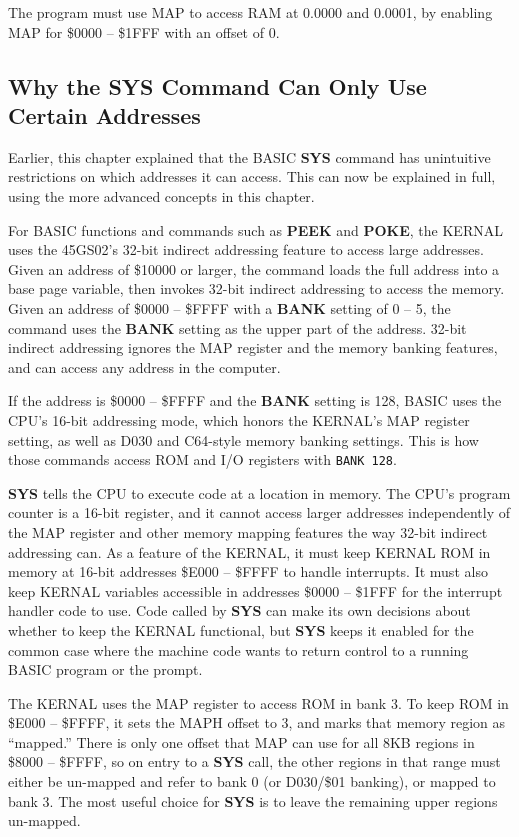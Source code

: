 The program must use MAP to access RAM at 0.0000 and 0.0001, by enabling MAP for \$0000 -- \$1FFF with an offset of 0.

\subsection{Why the SYS Command Can Only Use Certain Addresses}

Earlier, this chapter explained that the BASIC {\bf SYS} command has unintuitive restrictions on which addresses it can access. This can now be explained in full, using the more advanced concepts in this chapter.

For BASIC functions and commands such as {\bf PEEK} and {\bf POKE}, the KERNAL uses the 45GS02's 32-bit indirect addressing feature to access large addresses. Given an address of \$10000 or larger, the command loads the full address into a base page variable, then invokes 32-bit indirect addressing to access the memory. Given an address of \$0000 -- \$FFFF with a {\bf BANK} setting of 0 -- 5, the command uses the {\bf BANK} setting as the upper part of the address. 32-bit indirect addressing ignores the MAP register and the memory banking features, and can access any address in the computer.

If the address is \$0000 -- \$FFFF and the {\bf BANK} setting is 128, BASIC uses the CPU's 16-bit addressing mode, which honors the KERNAL's MAP register setting, as well as D030 and C64-style memory banking settings. This is how those commands access ROM and I/O registers with \texttt{BANK 128}.

{\bf SYS} tells the CPU to execute code at a location in memory. The CPU's program counter is a 16-bit register, and it cannot access larger addresses independently of the MAP register and other memory mapping features the way 32-bit indirect addressing can. As a feature of the KERNAL, it must keep KERNAL ROM in memory at 16-bit addresses \$E000 -- \$FFFF to handle interrupts. It must also keep KERNAL variables accessible in addresses \$0000 -- \$1FFF for the interrupt handler code to use. Code called by {\bf SYS} can make its own decisions about whether to keep the KERNAL functional, but {\bf SYS} keeps it enabled for the common case where the machine code wants to return control to a running BASIC program or the  prompt.

The KERNAL uses the MAP register to access ROM in bank 3. To keep ROM in \$E000 -- \$FFFF, it sets the MAPH offset to 3, and marks that memory region as ``mapped.'' There is only one offset that MAP can use for all 8KB regions in \$8000 -- \$FFFF, so on entry to a {\bf SYS} call, the other regions in that range must either be un-mapped and refer to bank 0 (or D030/\$01 banking), or mapped to bank 3. The most useful choice for {\bf SYS} is to leave the remaining upper regions un-mapped.

